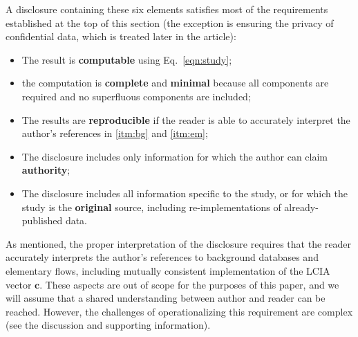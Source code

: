 A disclosure containing these six elements satisfies most of the requirements established at the top of this section (the exception is ensuring the privacy of confidential data, which is treated later in the article):
\begin{itemize}
  \item The result is \textbf{computable} using Eq.~\ref{eqn:study};
  \item the computation is \textbf{complete} and \textbf{minimal} because all components are required and no superfluous components are included;
  \item The results are \textbf{reproducible} if the reader is able to accurately interpret the author's references in \ref{itm:bg} and \ref{itm:em};
  \item The disclosure includes only information for which the author can claim \textbf{authority};
  \item The disclosure includes all information specific to the study, or for which the study is the \textbf{original} source, including re-implementations of already-published data. 
\end{itemize}
As mentioned, the proper interpretation of the disclosure requires that the reader accurately interprets the author's references to background databases and elementary flows, including mutually consistent implementation of the LCIA vector $\mathbf{c}$.  These aspects are out of scope for the purposes of this paper, and we will assume that a shared understanding between author and reader can be reached.  However, the challenges of operationalizing this requirement are complex (see the discussion and supporting information).  %

